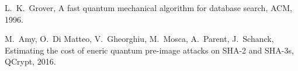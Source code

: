 \documentclass[a4paper,11pt]{article}
\begin{document}
\begin{otherlanguage}{english}
\begin{multicols}{2}
\begin{thebibliography}{1}
L.~K.~Grover,
\newblock A fast quantum mechanical algorithm for database search, 
 ACM, 1996.

M.~Amy, O.~Di Matteo, V.~Gheorghiu, M.~Mosca, A.~Parent, J.~Schanck,
\newblock Estimating the cost of eneric quantum pre-image attacks on SHA-2 and SHA-3s, 
 QCrypt, 2016.


  
\end{thebibliography}


\end{multicols}


\end{otherlanguage}
\end{document}
